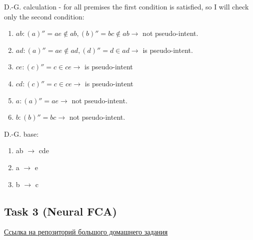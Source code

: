 D.-G. calculation - for all premises the first condition is satisfied, so I will check only the second condition:
\begin{enumerate}
\item $ab: (a)'' = ae \notin ab, (b)'' = bc \notin ab \rightarrow$ not pseudo-intent.
\item $ad: (a)'' = ae \notin ad, (d)'' = d \in ad \rightarrow$ is pseudo-intent.
\item $ce: (c)'' = c \in ce \rightarrow$ is pseudo-intent
\item $cd: (c)'' = c \in ce \rightarrow$ is pseudo-intent
\item $a: (a)'' = ae \rightarrow$ not pseudo-intent.
\item $b: (b)'' = bc \rightarrow$ not pseudo-intent.
\end{enumerate}

D.-G. base:
\begin{enumerate}
\item ab $\rightarrow$ cde
\item a $\rightarrow$ e
\item b $\rightarrow$ c
\end{enumerate}

\subsection{Task 3 (Neural FCA)}

\href{https://github.com/Chpel/Maga/tree/main/OSDA\%20.ipynb/Big\%20homework}{Ссылка на репозиторий большого домашнего задания}